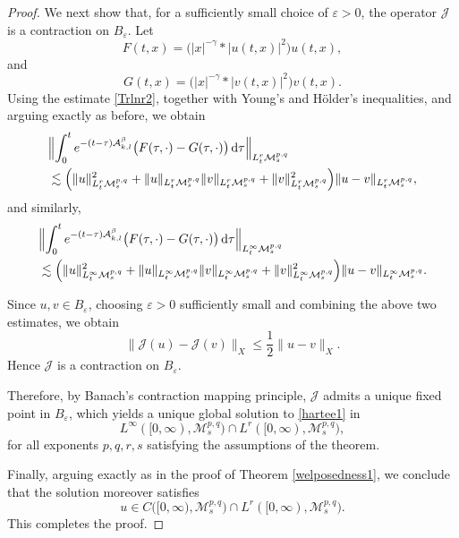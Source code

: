 \documentclass[10pt,a4paper]{amsart}
\def \Ad{\mathcal{A}_{k,l}}
\def\M{\mathcal{M}}
\begin{document}
\begin{proof}
{We next show that, for a sufficiently small choice of $\varepsilon>0$, the operator $\mathcal{J}$ is a contraction on $B_{\varepsilon}$.} Let
\[
F(t,x)
=
\bigl(|x|^{-\gamma}*|u(t,x)|^{2}\bigr)u(t,x),
\]
and
\[
G(t,x)
=
\bigl(|x|^{-\gamma}*|v(t,x)|^{2}\bigr)v(t,x).
\]
Using the estimate \eqref{Trlnr2}, together with Young's and
H\"older's inequalities, and arguing exactly as before, we obtain
\begin{align*}
&
\Bigl\|
\int_{0}^{t}
e^{-(t-\tau)\Ad^{\beta}}
\bigl(F(\tau,\cdot)-G(\tau,\cdot)\bigr)
\,\mathrm{d}\tau
\Bigr\|_{L^{r}_{t}\M^{p,q}_{s}}
\\
&\lesssim
\Bigl(
\|u\|_{L^{r}_{t}\M^{p,q}_{s}}^{2}
+
\|u\|_{L^{r}_{t}\M^{p,q}_{s}}
\|v\|_{L^{r}_{t}\M^{p,q}_{s}}
+
\|v\|_{L^{r}_{t}\M^{p,q}_{s}}^{2}
\Bigr)
\|u-v\|_{L^{r}_{t}\M^{p,q}_{s}},
\end{align*}
and similarly,
\begin{align*}
&
\Bigl\|
\int_{0}^{t}
e^{-(t-\tau)\Ad^{\beta}}
\bigl(F(\tau,\cdot)-G(\tau,\cdot)\bigr)
\,\mathrm{d}\tau
\Bigr\|_{L^{\infty}_{t}\M^{p,q}_{s}}
\\
&\lesssim
\Bigl(
\|u\|_{L^{\infty}_{t}\M^{p,q}_{s}}^{2}
+
\|u\|_{L^{\infty}_{t}\M^{p,q}_{s}}
\|v\|_{L^{\infty}_{t}\M^{p,q}_{s}}
+
\|v\|_{L^{\infty}_{t}\M^{p,q}_{s}}^{2}
\Bigr)
\|u-v\|_{L^{\infty}_{t}\M^{p,q}_{s}}.
\end{align*}

Since $u,v\in B_{\varepsilon}$, choosing $\varepsilon>0$
sufficiently small and combining the above two estimates, we obtain
\[
\|\mathcal{J}(u)-\mathcal{J}(v)\|_{X}
\leq
\frac{1}{2}
\|u-v\|_{X}.
\]
Hence $\mathcal{J}$ is a contraction on $B_{\varepsilon}$.

Therefore, by Banach's contraction mapping principle,
$\mathcal{J}$ admits a unique fixed point in $B_{\varepsilon}$,
which yields a unique global solution to \eqref{hartee1} in
\[
L^{\infty}([0,\infty),\M^{p,q}_{s})
\cap
L^{r}([0,\infty),\M^{p,q}_{s}),
\]
for all exponents $p,q,r,s$ satisfying the assumptions of the theorem.

Finally, arguing exactly as in the proof of Theorem
\ref{welposedness1}, we conclude that the solution moreover satisfies
\[
u
\in
C\bigl([0,\infty),\M^{p,q}_{s}\bigr)
\cap
L^{r}([0,\infty),\M^{p,q}_{s}).
\]
This completes the proof.
 \end{proof}
\end{document}
